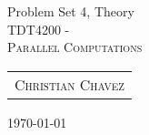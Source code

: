 \documentclass[fontsize=11pt, paper=a4, titlepage]{article}
\begin{document}
\begin{center}

{\huge Problem Set 4, Theory}\\[0.5cm]

\textsc{\LARGE TDT4200 -}\\[0.5cm]
\textsc{\large Parallel Computations}\\[1.0cm]

\begin{table}[h]
    \centering
    \begin{tabular}{c}
        \textsc{Christian Chavez}
    \end{tabular}
\end{table}

\end{center}
\vfill
\hfill \large{\today}
\clearpage
\end{document}

